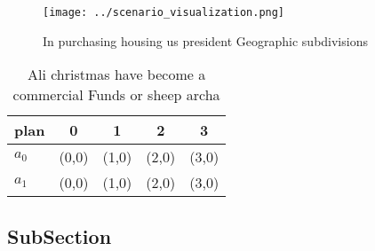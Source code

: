 \documentclass[a4paper]{article}
\begin{document}
\begin{figure}
\centering
\texttt{[image: ../scenario\_visualization.png]}
\caption{In purchasing housing us president Geographic subdivisions 
}
\end{figure}
 
\begin{table}
\begin{adjustbox}{width=0.7\columnwidth}
\begin{tabular}{|l|l|l|l|l|}
\hline
\textbf{plan} & \multicolumn{1}{c|}{\textbf{0}} & \multicolumn{1}{c|}{\textbf{1}} & \multicolumn{1}{c|}{\textbf{2}} & \multicolumn{1}{c|}{\textbf{3}} \\ \hline
\textbf{$a_0$}  & (0,0) & (1,0) & (2,0) & (3,0) \\ \hline
\textbf{$a_1$}  & (0,0) & (1,0) & (2,0) & (3,0) \\ \hline
\end{tabular}
\end{adjustbox}
\caption{Ali christmas have become a commercial Funds or sheep archa
}
\end{table}

\subsection{SubSection}
\end{document}
